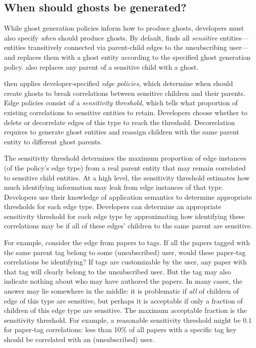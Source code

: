 \subsection{When should ghosts be generated?}
\label{design:edgepol}
While ghost generation policies inform \sys how to produce ghosts, developers must also specify
\emph{when} \sys should produce ghosts. 
By default, \sys finds all \emph{sensitive} entities---entities transitively connected via
parent-child edges to the unsubscribing user---and
replaces them with a ghost entity according to the specified ghost generation policy. \sys also
replaces any parent of a sensitive child with a ghost.

\sys then applies developer-specified \emph{edge policies}, which determine when \sys should
create ghosts to break correlations between sensitive children and their parents.
Edge policies consist of a \emph{sensitivity threshold}, which tells \sys what
proportion of existing correlations to sensitive entities to retain. Developers choose
whether to delete or decorrelate edges of this type to reach the threshold. Decorrelation requires
\sys to generate ghost entities and reassign children with the same parent entity to different
ghost parents.

%
The sensitivity threshold determines the maximum proportion of edge instances (of the policy's edge
type) from a real parent entity that may remain correlated to sensitive child entities.
At a high level, the sensitivity threshold estimates how much identifying information may leak from
edge instances of that type.  Developers use their knowledge of application semantics to determine
appropriate thresholds for each edge type.  Developers can determine an appropriate sensitivity
threshold for each edge type by approximating how identifying these correlations may be if
all of these edges' children to the same parent are sensitive.

For example, consider the edge from papers to tags. If all the papers tagged with the same parent
tag belong to some (unsubscribed) user, would these paper-tag correlations be identifying? If tags
are customizable by the user, any paper with that tag will clearly belong to the unsubscribed user.
But the tag may also indicate nothing about who may have authored the papers.  In many cases, the
answer may lie somewhere in the middle: it is problematic if \emph{all} of children of edge of this
type are sensitive, but perhaps it is acceptable if only a fraction of children of this edge type
are sensitive. The maximum acceptable fraction is the sensitivity threshold. For example, a
reasonable sensitivity threshold might be $0.1$ for paper-tag correlations: less than 10\% of
all papers with a specific tag key should be correlated with an (unsubscribed) user. 


